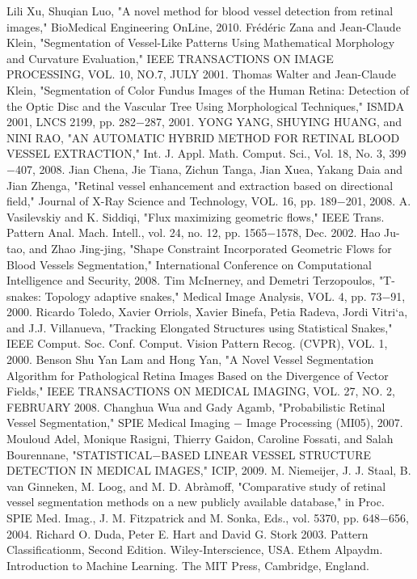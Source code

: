 \begin{thebibliography}{300}
 Lili Xu, Shuqian Luo, "A novel method for blood vessel detection from retinal images," BioMedical Engineering OnLine, 2010.
 Frédéric Zana and Jean-Claude Klein, "Segmentation of Vessel-Like Patterns Using Mathematical Morphology and Curvature Evaluation," IEEE TRANSACTIONS ON IMAGE PROCESSING, VOL. 10, NO.7, JULY 2001.
 Thomas Walter and Jean-Claude Klein, "Segmentation of Color Fundus Images of the Human Retina: Detection of the Optic Disc and the Vascular Tree Using Morphological Techniques," ISMDA 2001, LNCS 2199, pp. 282$-$287, 2001.
 YONG YANG, SHUYING HUANG, and NINI RAO, "AN AUTOMATIC HYBRID METHOD FOR RETINAL BLOOD VESSEL EXTRACTION," Int. J. Appl. Math. Comput. Sci., Vol. 18, No. 3, 399$-$407, 2008.
 Jian Chena, Jie Tiana, Zichun Tanga, Jian Xuea, Yakang Daia and Jian Zhenga, "Retinal vessel enhancement and extraction based on directional field," Journal of X-Ray Science and Technology, VOL. 16, pp. 189$-$201, 2008.
 A. Vasilevskiy and K. Siddiqi, "Flux maximizing geometric flows," IEEE Trans. Pattern Anal. Mach. Intell., vol. 24, no. 12, pp. 1565$-$1578, Dec. 2002.
 Hao Ju-tao, and Zhao Jing-jing, "Shape Constraint Incorporated Geometric Flows for Blood Vessels Segmentation," International Conference on Computational Intelligence and Security, 2008.
 Tim McInerney, and Demetri Terzopoulos, "T-snakes: Topology adaptive snakes," Medical Image Analysis, VOL. 4, pp. 73$-$91, 2000.
 Ricardo Toledo, Xavier Orriols, Xavier Binefa, Petia Radeva, Jordi Vitri`a, and J.J. Villanueva, "Tracking Elongated Structures using Statistical Snakes," IEEE Comput. Soc. Conf. Comput. Vision Pattern Recog. (CVPR), VOL. 1, 2000.
 Benson Shu Yan Lam and Hong Yan, "A Novel Vessel Segmentation Algorithm for Pathological Retina Images Based on the Divergence of Vector Fields," IEEE TRANSACTIONS ON MEDICAL IMAGING, VOL. 27, NO. 2, FEBRUARY 2008.
 Changhua Wua and Gady Agamb, "Probabilistic Retinal Vessel Segmentation," SPIE Medical Imaging $-$ Image Processing (MI05), 2007.
 Mouloud Adel, Monique Rasigni, Thierry Gaidon, Caroline Fossati, and Salah Bourennane, "STATISTICAL$-$BASED LINEAR VESSEL STRUCTURE DETECTION IN MEDICAL IMAGES," ICIP, 2009.
 M. Niemeijer, J. J. Staal, B. van Ginneken, M. Loog, and M. D. Abràmoff, "Comparative study of retinal vessel segmentation methods on a new publicly available database," in Proc. SPIE Med. Imag., J. M. Fitzpatrick and M. Sonka, Eds., vol. 5370, pp. 648$-$656, 2004.
 Richard O. Duda, Peter E. Hart and David G. Stork 2003. Pattern Classificationm, Second Edition. Wiley-Interscience, USA.
 Ethem Alpaydm. Introduction to Machine Learning. The MIT Press, Cambridge, England. 


\end{thebibliography}
